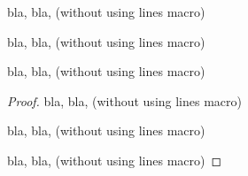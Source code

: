 \documentclass{article}
\newcommand{\lines}[1]{%
		\global\toggletrue{LinesMacroUsed}
		\foreach \x in {1,...,#1}{\par\noindent\strut\hrulefill\par}
	}
\begin{document}


\begin{MyProof}
	bla, bla, (without using lines macro)

	bla, bla, (without using lines macro)

	bla, bla, (without using lines macro)
\end{MyProof}

\begin{proof}
	bla, bla, (without using lines macro)

	bla, bla, (without using lines macro)

	bla, bla, (without using lines macro)
\end{proof}

\end{document}
